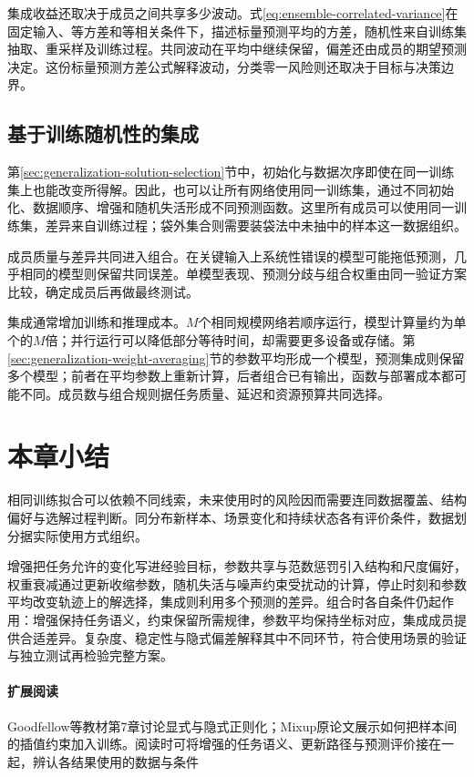 集成收益还取决于成员之间共享多少波动。式\eqref{eq:ensemble-correlated-variance}在固定输入、等方差和等相关条件下，描述标量预测平均的方差，随机性来自训练集抽取、重采样及训练过程。共同波动在平均中继续保留，偏差还由成员的期望预测决定。这份标量预测方差公式解释波动，分类零一风险则还取决于目标与决策边界。

\subsection{基于训练随机性的集成}
\label{sec:generalization-randomness-ensemble}

第\ref{sec:generalization-solution-selection}节中，初始化与数据次序即使在同一训练集上也能改变所得解。因此，也可以让所有网络使用同一训练集，通过不同初始化、数据顺序、增强和随机失活形成不同预测函数。这里所有成员可以使用同一训练集，差异来自训练过程；袋外集合则需要装袋法中未抽中的样本这一数据组织。

成员质量与差异共同进入组合。在关键输入上系统性错误的模型可能拖低预测，几乎相同的模型则保留共同误差。单模型表现、预测分歧与组合权重由同一验证方案比较，确定成员后再做最终测试。

集成通常增加训练和推理成本。$M$个相同规模网络若顺序运行，模型计算量约为单个的$M$倍；并行运行可以降低部分等待时间，却需要更多设备或存储。第\ref{sec:generalization-weight-averaging}节的参数平均形成一个模型，预测集成则保留多个模型；前者在平均参数上重新计算，后者组合已有输出，函数与部署成本都可能不同。成员数与组合规则据任务质量、延迟和资源预算共同选择。

\section{本章小结}
\label{sec:generalization-summary}

相同训练拟合可以依赖不同线索，未来使用时的风险因而需要连同数据覆盖、结构偏好与选解过程判断。同分布新样本、场景变化和持续状态各有评价条件，数据划分据实际使用方式组织。

增强把任务允许的变化写进经验目标，参数共享与范数惩罚引入结构和尺度偏好，权重衰减通过更新收缩参数，随机失活与噪声约束受扰动的计算，停止时刻和参数平均改变轨迹上的解选择，集成则利用多个预测的差异。组合时各自条件仍起作用：增强保持任务语义，约束保留所需规律，参数平均保持坐标对应，集成成员提供合适差异。复杂度、稳定性与隐式偏差解释其中不同环节，符合使用场景的验证与独立测试再检验完整方案。

\paragraph{扩展阅读}
Goodfellow等教材第7章讨论显式与隐式正则化；Mixup原论文展示如何把样本间的插值约束加入训练。阅读时可将增强的任务语义、更新路径与预测评价接在一起，辨认各结果使用的数据与条件
